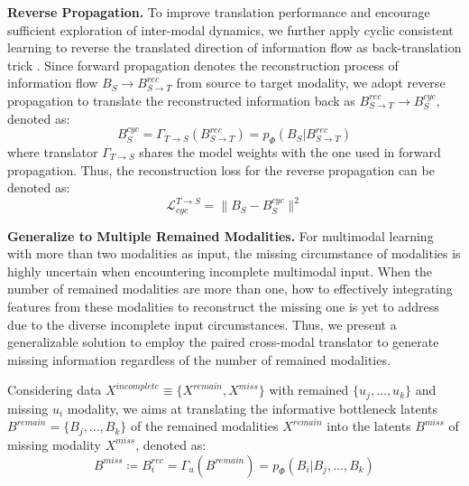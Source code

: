 \documentclass{article}
\begin{document}
\textbf{Reverse Propagation.} To improve translation performance and encourage sufficient exploration of inter-modal dynamics, we further apply cyclic consistent learning \cite{wang2020transmodality,zhao2021missing} to reverse the translated direction of information flow as back-translation trick \cite{hoang2018iteractivebt}. Since forward propagation denotes the reconstruction process of information flow $B_S\rightarrow B^{rec}_{S\rightarrow T}$ from source to target modality, we adopt reverse propagation to translate the reconstructed information back as $B^{rec}_{S\rightarrow T} \rightarrow B^{cyc}_S$, denoted as:
\begin{equation}
    B_S^{cyc} =\Gamma_{T\rightarrow S}(B_{S\rightarrow T}^{rec}) = p_\Phi(B_S|B_{S\rightarrow T}^{rec})
\end{equation}
where translator $\Gamma_{T\rightarrow S}$ shares the model weights with the one used in forward propagation. Thus, the reconstruction loss for the reverse propagation can be denoted as:
\begin{equation}
    \mathcal{L}^{T\rightarrow S}_{cyc} =\parallel B_S - B_S^{cyc} \parallel^2
\end{equation}

\textbf{Generalize to Multiple Remained Modalities.} For multimodal learning with more than two modalities as input, the missing circumstance of modalities is highly uncertain when encountering incomplete multimodal input. When the number of remained modalities are more than one, how to effectively integrating features from these modalities to reconstruct the missing one is yet to address due to the diverse incomplete input circumstances. Thus, we present a generalizable solution to employ the paired cross-modal translator to generate missing information regardless of the number of remained modalities.

Considering data $X^{incomplete}\equiv \{X^{remain}, X^{miss}\}$ with remained $\{u_j,...,u_k\}$ and missing $u_i$ modality, we aims at translating the informative bottleneck latents $B^{remain}=\{B_j,...,B_k\}$ of the remained modalities $X^{remain}$ into the latents $B^{miss}$ of missing modality $X^{miss}$, denoted as:
\begin{equation}
    B^{miss}\coloneqq B_{i}^{rec} =\Gamma_u(B^{remain}) = p_\Phi(B_i|B_j,...,B_k)
\end{equation}
\end{document}
